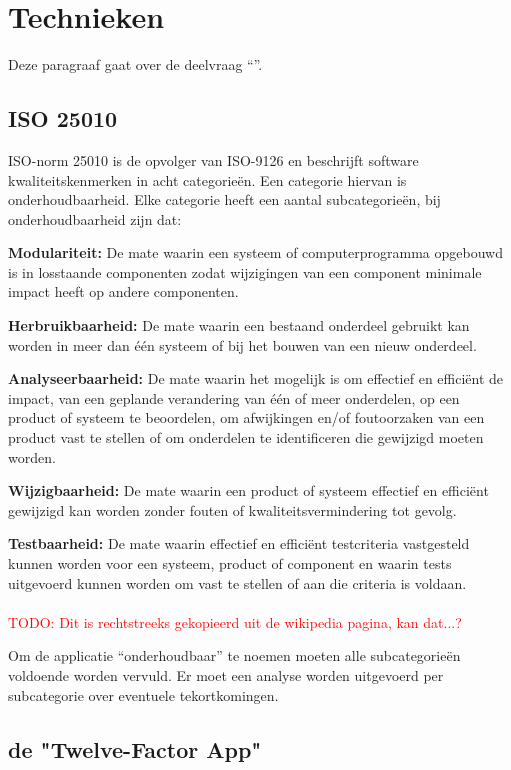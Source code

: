 \chapter{Technieken}

\label{Chapter3}

Deze paragraaf gaat over de deelvraag \enquote{\deeltechnieken}.

\section{ISO 25010}

ISO-norm 25010 \parencite{ISO25010} is de opvolger van ISO-9126 en beschrijft software kwaliteitskenmerken in acht categorieën. Een categorie hiervan is onderhoudbaarheid. Elke categorie heeft een aantal subcategorieën, bij onderhoudbaarheid zijn dat:

\textbf{Modulariteit:} De mate waarin een systeem of computerprogramma opgebouwd is in losstaande componenten zodat wijzigingen van een component minimale impact heeft op andere componenten.

\textbf{Herbruikbaarheid:} De mate waarin een bestaand onderdeel gebruikt kan worden in meer dan één systeem of bij het bouwen van een nieuw onderdeel.

\textbf{Analyseerbaarheid:} De mate waarin het mogelijk is om effectief en efficiënt de impact, van een geplande verandering van één of meer onderdelen, op een product of systeem te beoordelen, om afwijkingen en/of foutoorzaken van een product vast te stellen of om onderdelen te identificeren die gewijzigd moeten worden.

\textbf{Wijzigbaarheid:} De mate waarin een product of systeem effectief en efficiënt gewijzigd kan worden zonder fouten of kwaliteitsvermindering tot gevolg.

\textbf{Testbaarheid:} De mate waarin effectief en efficiënt testcriteria vastgesteld kunnen worden voor een systeem, product of component en waarin tests uitgevoerd kunnen worden om vast te stellen of aan die criteria is voldaan.
\\\\
\textcolor{red}{TODO: Dit is rechtstreeks gekopieerd uit de wikipedia pagina, kan dat...?} %

Om de applicatie \enquote{onderhoudbaar} te noemen moeten alle subcategorieën voldoende worden vervuld. Er moet een analyse worden uitgevoerd per subcategorie over eventuele tekortkomingen.


\section{de "Twelve-Factor App"}

